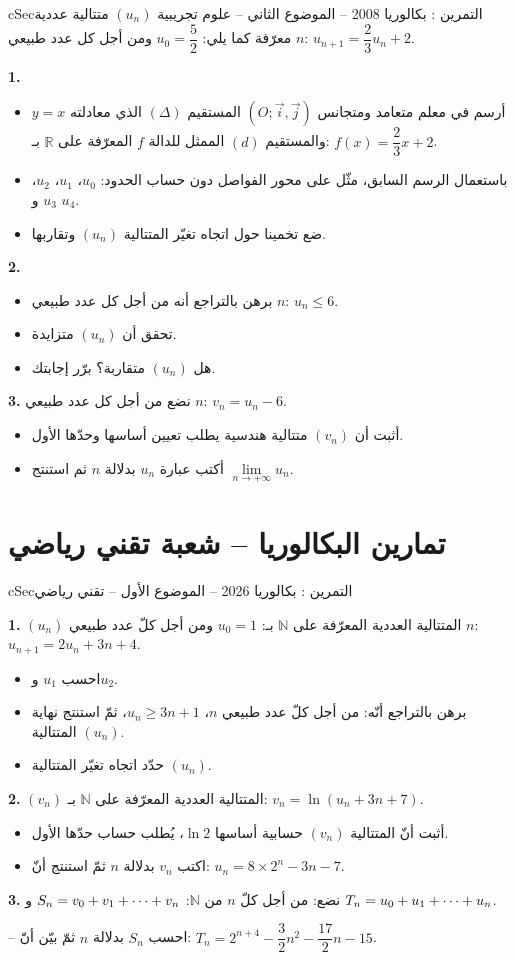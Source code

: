 \documentclass[12pt,a4paper]{article}
\newenvironment{BOX}[2]{\begin{otherlanguage}{english}\begin{arbox}{#1}{#2}}{\end{arbox}\end{otherlanguage}}
\newcounter{exo}
\newenvironment{tamrin}[1]{\stepcounter{exo}\begin{BOX}{cSec}{التمرين \theexo: #1}}{\end{BOX}}
\renewcommand{\cdots}{\mathinner{\cdotp\cdotp\cdotp}}
\newcommand{\N}{\mathbb{N}}
\newcommand{\R}{\mathbb{R}}
\newenvironment{sq}{\begin{itemize}[leftmargin=2.4em,itemsep=3pt]}{\end{itemize}}
\newcommand{\qa}{\item[(أ)]}\newcommand{\qb}{\item[(ب)]}\newcommand{\qc}{\item[(جـ)]}\newcommand{\qd}{\item[(د)]}\newcommand{\qe}{\item[(هـ)]}
\newcommand{\QQ}[1]{\par\smallskip\textbf{#1.} }
\begin{document}
\begin{tamrin}{بكالوريا 2008 -- الموضوع الثاني -- علوم تجريبية}
$(u_n)$ متتالية عددية معرّفة كما يلي: $u_0=\dfrac52$ ومن أجل كل عدد طبيعي $n$: $u_{n+1}=\dfrac23u_n+2$.
\QQ{1}
\begin{sq}
\qa أرسم في معلم متعامد ومتجانس $(O;\vec i,\vec j)$ المستقيم $(\Delta)$ الذي معادلته $y=x$ والمستقيم $(d)$ الممثل للدالة $f$ المعرّفة على $\R$ بـ: $f(x)=\dfrac23x+2$.
\qb باستعمال الرسم السابق، مثّل على محور الفواصل دون حساب الحدود: $u_0$، $u_1$، $u_2$، $u_3$ و $u_4$.
\qc ضع تخمينا حول اتجاه تغيّر المتتالية $(u_n)$ وتقاربها.
\end{sq}
\QQ{2}
\begin{sq}
\qa برهن بالتراجع أنه من أجل كل عدد طبيعي $n$: $u_n\le 6$.
\qb تحقق أن $(u_n)$ متزايدة.
\qc هل $(u_n)$ متقاربة؟ برّر إجابتك.
\end{sq}
\QQ{3} نضع من أجل كل عدد طبيعي $n$: $v_n=u_n-6$.
\begin{sq}
\qa أثبت أن $(v_n)$ متتالية هندسية يطلب تعيين أساسها وحدّها الأول.
\qb أكتب عبارة $u_n$ بدلالة $n$ ثم استنتج $\lim\limits_{n\to+\infty}u_n$.
\end{sq}
\end{tamrin}

\section{تمارين البكالوريا -- شعبة تقني رياضي}
\begin{tamrin}{بكالوريا 2026 -- الموضوع الأول -- تقني رياضي}
\QQ{1} $(u_n)$ المتتالية العددية المعرّفة على $\N$ بـ: $u_0=1$ ومن أجل كلّ عدد طبيعي $n$: $u_{n+1}=2u_n+3n+4$.
\begin{sq}
\qa احسب $u_1$ و$u_2$.
\qb برهن بالتراجع أنّه: من أجل كلّ عدد طبيعي $n$، $u_n\geq 3n+1$، ثمّ استنتج نهاية المتتالية $(u_n)$.
\qc حدّد اتجاه تغيّر المتتالية $(u_n)$.
\end{sq}

\QQ{2} $(v_n)$ المتتالية العددية المعرّفة على $\N$ بـ: $v_n=\ln(u_n+3n+7)$.
\begin{sq}
\qa أثبت أنّ المتتالية $(v_n)$ حسابية أساسها $\ln2$، يُطلب حساب حدّها الأول.
\qb اكتب $v_n$ بدلالة $n$ ثمّ استنتج أنّ: $u_n=8\times2^n-3n-7$.
\end{sq}

\QQ{3} نضع: من أجل كلّ $n$ من $\N$: $S_n=v_0+v_1+\cdots+v_n$ و $T_n=u_0+u_1+\cdots+u_n$.

-- احسب $S_n$ بدلالة $n$ ثمّ بيّن أنّ: $T_n=2^{n+4}-\dfrac32 n^2-\dfrac{17}{2}n-15$.
\end{tamrin}
\end{document}
